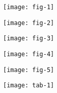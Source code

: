 \begin{frame}[plain]
\begin{center}
\texttt{[image: fig-1]}
\end{center}
\end{frame}
\begin{frame}[plain]
\begin{center}
\texttt{[image: fig-2]}
\end{center}
\end{frame}
\begin{frame}[plain]
\begin{center}
\texttt{[image: fig-3]}
\end{center}
\end{frame}
\begin{frame}[plain]
\begin{center}
\texttt{[image: fig-4]}
\end{center}
\end{frame}
\begin{frame}[plain]
\begin{center}
\texttt{[image: fig-5]}
\end{center}
\end{frame}
\begin{frame}[plain]
\begin{center}
\texttt{[image: tab-1]}
\end{center}
\end{frame}
